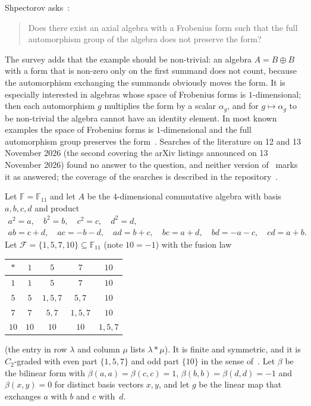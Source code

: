 \documentclass[11pt]{article}
\theoremstyle{remark}
\newcommand{\F}{\mathbb{F}}
\begin{document}
Shpectorov asks~\cite[Problem~3.3]{gs}:
\begin{quote}
Does there exist an axial algebra with a Frobenius form such that the full
automorphism group of the algebra does not preserve the form?
\end{quote}
The survey adds that the example should be non-trivial: an algebra $A=B\oplus B$
with a form that is non-zero only on the first summand does not count, because
the automorphism exchanging the summands obviously moves the form. It is
especially interested in algebras whose space of Frobenius forms is
$1$-dimensional; then each automorphism $g$ multiplies the form by a scalar
$\alpha_g$, and for $g\mapsto\alpha_g$ to be non-trivial the algebra cannot have
an identity element. In most known examples the space of Frobenius forms is
$1$-dimensional and the full automorphism group preserves the form~\cite{gs}.
Searches of the literature on 12 and 13 November 2026 (the second covering the
arXiv listings announced on 13 November 2026) found no answer to the question,
and neither version of~\cite{gs} marks it as answered; the coverage of the
searches is described in the repository~\cite{repo}.

Let $\F=\F_{11}$ and let $A$ be the $4$-dimensional commutative algebra with
basis $a,b,c,d$ and product
\begin{gather*}
a^2=a,\quad b^2=b,\quad c^2=c,\quad d^2=d,\\
ab=c+d,\quad ac=-b-d,\quad ad=b+c,\quad bc=a+d,\quad bd=-a-c,\quad cd=a+b.
\end{gather*}
Let $\mathcal F=\{1,5,7,10\}\subseteq\F_{11}$ (note $10=-1$) with the fusion law
\begin{center}
\begin{tabular}{c|cccc}
$\ast$ & $1$ & $5$ & $7$ & $10$\\\hline
$1$ & $1$ & $5$ & $7$ & $10$\\
$5$ & $5$ & $1,5,7$ & $5,7$ & $10$\\
$7$ & $7$ & $5,7$ & $1,5,7$ & $10$\\
$10$ & $10$ & $10$ & $10$ & $1,5,7$
\end{tabular}
\end{center}
(the entry in row $\lambda$ and column $\mu$ lists $\lambda\ast\mu$). It is
finite and symmetric, and it is $C_2$-graded with even part $\{1,5,7\}$ and odd
part $\{10\}$ in the sense of~\cite[Section~2]{gs}. Let $\beta$ be the bilinear
form with $\beta(a,a)=\beta(c,c)=1$, $\beta(b,b)=\beta(d,d)=-1$ and
$\beta(x,y)=0$ for distinct basis vectors $x,y$, and let $g$ be the linear map
that exchanges $a$ with $b$ and $c$ with~$d$.
\end{document}
